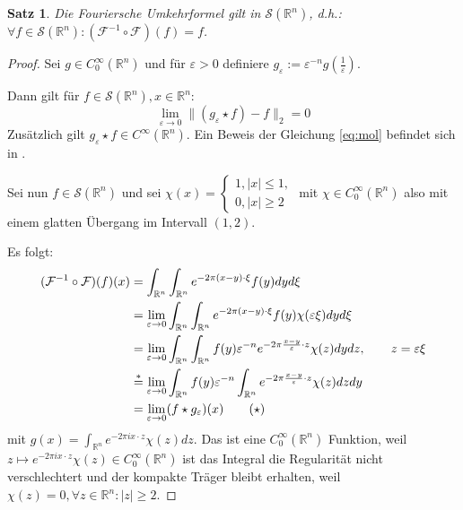 \documentclass{article}
\newcommand{\R}[0]{\mathbb{R}}
\newcommand{\F}[0]{\mathcal{F}}
\newcommand{\Ssp}[0]{\mathcal{S}}
\newtheorem{thm}{Satz}
\begin{document}
\begin{thm}
    Die Fouriersche Umkehrformel gilt in $\Ssp(\R^n)$, d.h.: $\forall f\in \Ssp(\R^n): (\F^{-1} \circ \F)(f) = f$.
\end{thm}

\begin{proof}\cite[S. 424, Theorem 24.1.1]{ebert2018methods}
    Sei $g \in C^{\infty}_0(\R^n)$ und für $\varepsilon > 0$ definiere $g_{\varepsilon} := \varepsilon^{-n} g(\frac{1}{\varepsilon})$.

    Dann gilt für $f \in \Ssp(\R^n), x \in \R^n$:
    \begin{equation}\label{eq:mol}
        \lim\limits_{\varepsilon \to 0} \lVert (g_{\varepsilon} \star f) - f\rVert_2 = 0
    \end{equation}
    Zusätzlich gilt $g_{\varepsilon} \star f \in C^{\infty}(\R^n)$.
    Ein Beweis der Gleichung \ref{eq:mol} befindet sich in \cite[S. 183ff.]{walter1966analysis}.

    Sei nun $f \in \Ssp(\R^n)$ und sei $\chi(x) = \begin{cases}
        1, |x| \leq 1, \\
        0, |x| \geq 2
    \end{cases}$ mit $\chi \in C^{\infty}_0(\R^n)$ also mit einem glatten Übergang im Intervall $(1, 2)$.

    Es folgt:
    \begin{align*}
        (\F^{-1} \circ \F)(f)(x) &= \int_{\R^n} \int_{\R^n} e^{-2\pi (x - y) \cdot \xi} f(y) dy d\xi \\
        &= \lim\limits_{\varepsilon \to 0} \int_{\R^n} \int_{\R^n} e^{-2\pi (x - y) \cdot \xi} f(y) \chi(\varepsilon \xi) dy d\xi \\
        &= \lim\limits_{\varepsilon \to 0} \int_{\R^n} \int_{\R^n} f(y) \varepsilon^{-n} e^{-2 \pi \frac{x - y}{\varepsilon} \cdot z}\chi(z) dy dz, \hspace*{20px} z = \varepsilon \xi \\
        &\overset{*}{=} \lim\limits_{\varepsilon \to 0} \int_{\R^n} f(y) \varepsilon^{-n} \int_{\R^n} e^{-2 \pi \frac{x - y}{\varepsilon} \cdot z}\chi(z) dz dy\\
        &= \lim\limits_{\varepsilon \to 0} (f \star g_{\varepsilon})(x) \hspace*{20px} (\star)
    \end{align*}
    mit $g(x) = \int_{\R^n}e^{-2\pi ix \cdot z} \chi(z) dz$. Das ist eine $C^{\infty}_0(\R^n)$ Funktion, weil $z \mapsto e^{-2\pi ix \cdot z} \chi(z) \in C^{\infty}_0(\R^n)$ 
    ist das Integral die Regularität nicht verschlechtert und der kompakte Träger bleibt erhalten, weil $\chi(z) = 0, \forall z \in \R^n: |z| \geq 2$.


\end{proof}
\end{document}
